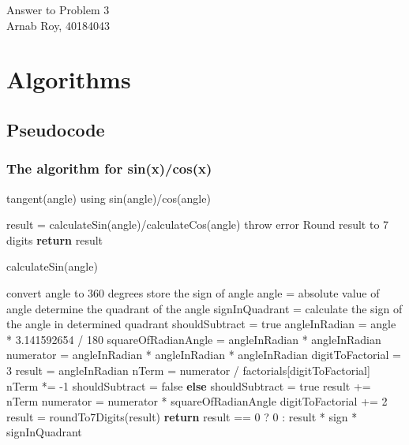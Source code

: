 \documentclass[12pt]{article}
\begin{document}
\begin{center}
    \huge{Answer to Problem 3} \\
    \large{Arnab Roy, 40184043}
\end{center}

\section{Algorithms}
\subsection{Pseudocode}
\subsubsection{The algorithm for sin(x)/cos(x)}
\begin{algorithm}[H]
	\caption{tangent(angle) using sin(angle)/cos(angle)} 
	\begin{algorithmic}[1]
		\State result = calculateSin(angle)/calculateCos(angle)
		\State throw error
		\EndIf
		\State Round result to 7 digits
        \State \textbf{return} result
	\end{algorithmic} 
\end{algorithm}

\begin{algorithm}[H]
	\caption{calculateSin(angle)} 
	\begin{algorithmic}[1]
		\State convert angle to 360 degrees
		    \State store the sign of angle
		    \State angle = absolute value of angle
		\EndIf
		\State determine the quadrant of the angle
		\State signInQuadrant = calculate the sign of the angle in determined quadrant
		\State shouldSubtract = true
		\State angleInRadian = angle * 3.141592654 / 180
		\State squareOfRadianAngle = angleInRadian * angleInRadian
		\State numerator = angleInRadian * angleInRadian * angleInRadian
		\State digitToFactorial = 3
		\State result = angleInRadian
         \State nTerm = numerator / factorials[digitToFactorial]
            \State nTerm *= -1
            \State shouldSubtract = false
            \State \textbf{else}
            \State shouldSubtract = true
        \EndIf
        \State result += nTerm
        \State numerator = numerator * squareOfRadianAngle
        digitToFactorial += 2
        \EndFor
        \State result = roundTo7Digits(result)
        \State \textbf{return} result == 0 ? 0 : result * sign * signInQuadrant
	\end{algorithmic} 
\end{algorithm}
\end{document}

